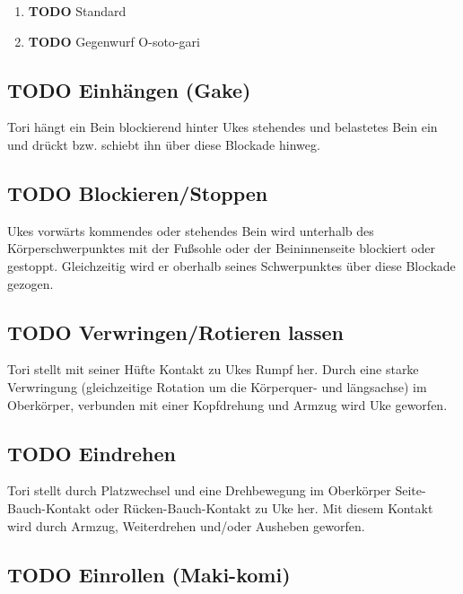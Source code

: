 \documentclass[11pt]{article}
\begin{document}
\begin{enumerate}
\item {\bfseries\sffamily TODO} Standard
\label{sec:org6fd7a1c}

\item {\bfseries\sffamily TODO} Gegenwurf O-soto-gari
\label{sec:orgd23b2c7}
\end{enumerate}

\subsection{{\bfseries\sffamily TODO} Einhängen (Gake)}
\label{sec:org5a70f5f}

Tori hängt ein Bein blockierend hinter Ukes stehendes und belastetes Bein ein und drückt bzw.
schiebt ihn über diese Blockade hinweg.

\subsection{{\bfseries\sffamily TODO} Blockieren/Stoppen}
\label{sec:org33280a4}

Ukes vorwärts kommendes oder stehendes Bein wird unterhalb des Körperschwerpunktes mit der
Fußsohle oder der Beininnenseite blockiert oder gestoppt. Gleichzeitig wird er oberhalb seines
Schwerpunktes über diese Blockade gezogen.

\subsection{{\bfseries\sffamily TODO} Verwringen/Rotieren lassen}
\label{sec:org8d68053}

Tori stellt mit seiner Hüfte Kontakt zu Ukes Rumpf her. Durch eine starke Verwringung (gleichzeitige
Rotation um die Körperquer- und längsachse) im Oberkörper, verbunden mit einer Kopfdrehung und
Armzug wird Uke geworfen.

\subsection{{\bfseries\sffamily TODO} Eindrehen}
\label{sec:orgd95ccfc}

Tori stellt durch Platzwechsel und eine Drehbewegung im Oberkörper Seite-Bauch-Kontakt oder
Rücken-Bauch-Kontakt zu Uke her. Mit diesem Kontakt wird durch Armzug, Weiterdrehen und/oder
Ausheben geworfen.

\subsection{{\bfseries\sffamily TODO} Einrollen (Maki-komi)}
\label{sec:org0c7a311}
\end{document}
